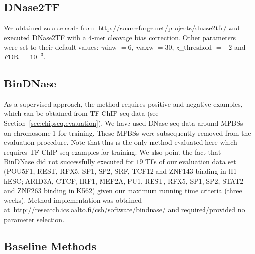 \subsection{DNase2TF}
\label{sec:dnase2tf}

We obtained source code from~\url{http://sourceforge.net/projects/dnase2tfr/} and executed DNase2TF with a $4$-mer cleavage bias correction. Other parameters were set to their default values: {\emph minw} $= 6$, {\emph maxw} $= 30$, {\emph z\_threshold} $= -2$ and {\emph FDR} $= 10^{-3}$.

\subsection{BinDNase}
\label{sec:bindnase}

As a supervised approach, the method requires positive and negative examples, which can be obtained from TF ChIP-seq data (see Section~\ref{sec:chipseq.evaluation}). We have used DNase-seq data around MPBSs on chromosome 1 for training. These MPBSs were subsequently removed from the evaluation procedure. Note that this is the only method evaluated here which requires TF ChIP-seq examples for training. We also point the fact that BinDNase did not successfully executed for $19$ TFs of our evaluation data set (POU5F1, REST, RFX5, SP1, SP2, SRF, TCF12 and ZNF143 binding in H1-hESC; ARID3A, CTCF, IRF1, MEF2A, PU1, REST, RFX5, SP1, SP2, STAT2 and ZNF263 binding in K562) given our maximum running time criteria (three weeks). Method implementation was obtained at~\url{http://research.ics.aalto.fi/csb/software/bindnase/} and required/provided no parameter selection.

\subsection{Baseline Methods}
\label{sec:baseline.methods}



